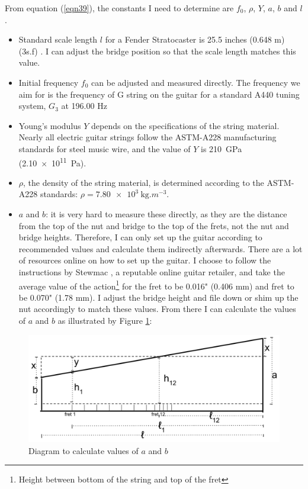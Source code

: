 From equation (\ref{eqn39}), the constants I need to determine are $f_0$, $\rho$, $Y$, $a$, $b$ and $l$. 
\begin{itemize}
    \item Standard scale length $l$ for a Fender Stratocaster is 25.5 inches (0.648 m) (3s.f) \cite{scale}. I can adjust the bridge position so that the scale length matches this value.
    \item Initial frequency $f_0$ can be adjusted and measured directly. The frequency we aim for is the frequency of G string on the guitar for a standard A440 tuning system, $G_3$ at 196.00 Hz \cite{freq_chart}
    \item Young's modulus $Y$ depends on the specifications of the string material. Nearly all electric guitar strings follow the ASTM-A228 manufacturing standards for steel music wire, and the value of $Y$ is \SI{210}{\giga\pascal} (\SI{2.10e11}{\pascal}). \cite{astm} 
    \item $\rho$, the density of the string material, is determined according to the ASTM-A228 standards: $\rho = \SI{7.80e3}{\kg.m^{-3}}$. \cite{astm}
    \item $a$ and $b$: it is very hard to measure these directly, as they are the distance from the top of the nut and bridge to the top of the frets, not the nut and bridge heights. Therefore, I can only set up the guitar according to recommended values and calculate them indirectly afterwards. There are a lot of resources online on how to set up the guitar. I choose to follow the instructions by Stewmac \cite{stewmac}, a reputable online guitar retailer, and take the average value of the action\footnote{Height between bottom of the string and top of the fret} for the  fret to be 0.016" (0.406 mm) and  fret to be 0.070" (1.78 mm). I adjust the bridge height and file down or shim up the nut accordingly to match these values. From there I can calculate the values of $a$ and $b$ as illustrated by Figure \ref{fig3}: \par
\end{itemize}
\begin{figure}[!htbp]
    \includegraphics[width = \textwidth]{./ee/fig4.png}
    \caption{Diagram to calculate values of $a$ and $b$} \label{fig3}
\end{figure}

